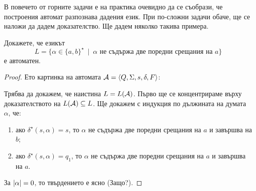 В повечето от горните задачи е на практика очевидно да се съобрази, че построения автомат разпознава дадения език.
При по-сложни задачи обаче, ще се наложи да дадем доказателство.
Ще дадем няколко такива примера.

\begin{prb}
  Докажете, че езикът
  \[L = \{\alpha \in \{a,b\}^\star\ \mid\ \alpha\mbox{ не съдържа две поредни срещания на }a\}\]
  е автоматен.
\end{prb}
\begin{proof}
  Ето картинка на автомата $\mathcal{A} = \langle{Q,\Sigma,s,\delta,F}\rangle$:
  \begin{figure}[h!]
    \begin{subfigure}[b]{0.3\textwidth}%
    \end{subfigure}
 \end{figure}

 Трябва да докажем, че наистина $L = L(\mathcal{A})$.
 Първо ще се концентрираме върху доказателството на $L(\mathcal{A}) \subseteq L$.
 Ще докажем с индукция по дължината на думата $\alpha$, че:
 \begin{enumerate}[(1)]
 \item 
   ако $\delta^\star(s,\alpha) = s$, то
   $\alpha$ не съдържа две поредни срещания на $a$
   и завършва на $b$;
 \item
   ако $\delta^\star(s,\alpha) = q_1$, то
   $\alpha$ не съдържа две поредни срещания на $a$
   и завършва на $a$.
 \end{enumerate}

 За $\vert{\alpha}\vert = 0$, то твърдението е ясно (Защо?).
 

\end{proof}
